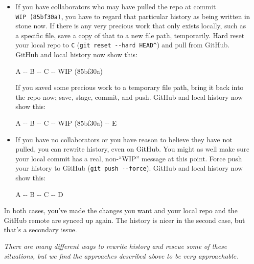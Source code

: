 \documentclass[
]{book}
\newenvironment{Shaded}{\begin{snugshade}}{\end{snugshade}}
\newcommand{\NormalTok}[1]{#1}
\begin{document}
\begin{itemize}
\item
  If you have collaborators who may have pulled the repo at commit
  \texttt{WIP\ (85bf30a)}, you have to regard that particular history as being written
  in stone now.
  If there is any very precious work that only exists locally, such as a
  specific file, save a copy of that to a new file path, temporarily.
  Hard reset your local repo to \texttt{C} (\texttt{git\ reset\ -\/-hard\ HEAD\^{}}) and pull from
  GitHub.
  GitHub and local history now show this:

\begin{Shaded}
\begin{Highlighting}[]
\NormalTok{A {-}{-} B {-}{-} C {-}{-} WIP (85bf30a)}
\end{Highlighting}
\end{Shaded}

  If you saved some precious work to a temporary file path, bring it back into
  the repo now; save, stage, commit, and push.
  GitHub and local history now show this:

\begin{Shaded}
\begin{Highlighting}[]
\NormalTok{A {-}{-} B {-}{-} C {-}{-} WIP (85bf30a) {-}{-} E}
\end{Highlighting}
\end{Shaded}
\item
  If you have no collaborators or you have reason to believe they have not
  pulled, you can rewrite history, even on GitHub.
  You might as well make sure your local commit has a real, non-``WIP'' message
  at this point.
  Force push your history to GitHub (\texttt{git\ push\ -\/-force}).
  GitHub and local history now show this:

\begin{Shaded}
\begin{Highlighting}[]
\NormalTok{A {-}{-} B {-}{-} C {-}{-} D}
\end{Highlighting}
\end{Shaded}
\end{itemize}

In both cases, you've made the changes you want and your local repo and the
GitHub remote are synced up again.
The history is nicer in the second case, but that's a secondary issue.

\emph{There are many different ways to rewrite history and rescue some of these situations, but we find the approaches described above to be very approachable.}
\end{document}
